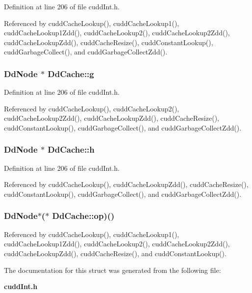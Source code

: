 Definition at line 206 of file cudd\-Int.h.

Referenced by cudd\-Cache\-Lookup(), cudd\-Cache\-Lookup1(), cudd\-Cache\-Lookup1Zdd(), cudd\-Cache\-Lookup2(), cudd\-Cache\-Lookup2Zdd(), cudd\-Cache\-Lookup\-Zdd(), cudd\-Cache\-Resize(), cudd\-Constant\-Lookup(), cudd\-Garbage\-Collect(), and cudd\-Garbage\-Collect\-Zdd().
\subsubsection{\setlength{\rightskip}{0pt plus 5cm}\bf{Dd\-Node} $\ast$ \bf{Dd\-Cache::g}}\label{structDdCache_b48d28fd4600939906495aed6598407c}




Definition at line 206 of file cudd\-Int.h.

Referenced by cudd\-Cache\-Lookup(), cudd\-Cache\-Lookup2(), cudd\-Cache\-Lookup2Zdd(), cudd\-Cache\-Lookup\-Zdd(), cudd\-Cache\-Resize(), cudd\-Constant\-Lookup(), cudd\-Garbage\-Collect(), and cudd\-Garbage\-Collect\-Zdd().
\subsubsection{\setlength{\rightskip}{0pt plus 5cm}\bf{Dd\-Node} $\ast$ \bf{Dd\-Cache::h}}\label{structDdCache_79e96802cf2024d04d471932c8a62a02}




Definition at line 206 of file cudd\-Int.h.

Referenced by cudd\-Cache\-Lookup(), cudd\-Cache\-Lookup\-Zdd(), cudd\-Cache\-Resize(), cudd\-Constant\-Lookup(), cudd\-Garbage\-Collect(), and cudd\-Garbage\-Collect\-Zdd().
\subsubsection{\setlength{\rightskip}{0pt plus 5cm}\bf{Dd\-Node}$\ast$($\ast$ \bf{Dd\-Cache::op})()}\label{structDdCache_1b8d5655d14187381f85c38df890633f}




Referenced by cudd\-Cache\-Lookup(), cudd\-Cache\-Lookup1(), cudd\-Cache\-Lookup1Zdd(), cudd\-Cache\-Lookup2(), cudd\-Cache\-Lookup2Zdd(), cudd\-Cache\-Lookup\-Zdd(), cudd\-Cache\-Resize(), and cudd\-Constant\-Lookup().

The documentation for this struct was generated from the following file:\begin{CompactItemize}
\item 
\bf{cudd\-Int.h}\end{CompactItemize}
